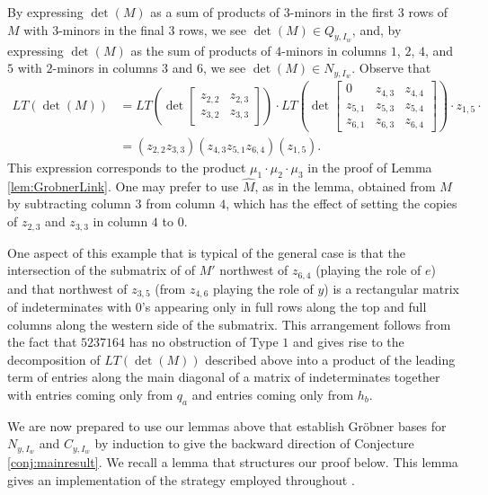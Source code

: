 \begin{example}
 By expressing $\det(M)$ as a sum of products of $3$-minors in the first $3$ rows of $M$ with $3$-minors in the final $3$ rows, we see $\det(M) \in Q_{y,I_w}$, and, by expressing $\det(M)$ as the sum of products of $4$-minors in columns $1$, $2$, $4$, and $5$ with $2$-minors in columns $3$ and $6$, we see $\det(M) \in N_{y,I_w}$.  Observe that \begin{align*}
 LT(\det(M)) &=  LT\left(\det \begin{bmatrix} z_{2,2} & z_{2,3} \\ z_{3,2} & z_{3,3} \end{bmatrix} \right) \cdot LT\left(\det  \begin{bmatrix} 0 & z_{4,3} & z_{4,4} \\ z_{5,1} & z_{5,3} & z_{5,4} \\ z_{6,1} & z_{6,3} & z_{6,4} \end{bmatrix}\right) \cdot z_{1,5} \cdot\\
 &= (z_{2,2}z_{3,3})(z_{4,3}z_{5,1}z_{6,4})(z_{1,5}).
 \end{align*}
 This expression corresponds to the product $\mu_1 \cdot \mu_2 \cdot \mu_3$ in the proof of Lemma \ref{lem:GrobnerLink}.  One may prefer to use $\widehat{M}$, as in the lemma, obtained from $M$ by subtracting column $3$ from column $4$, which has the effect of setting the copies of $z_{2,3}$ and $z_{3,3}$ in column $4$ to $0$.  
 
One aspect of this example that is typical of the general case is that the intersection of the submatrix of of $M'$ northwest of $z_{6,4}$ (playing the role of $e$) and that northwest of $z_{3,5}$ (from $z_{4,6}$ playing the role of $y$) is a rectangular matrix of indeterminates with $0$'s appearing only in full rows along the top and full columns along the western side of the submatrix.  This arrangement follows from the fact that $5237164$ has no obstruction of Type $1$ and gives rise to the decomposition of $LT(\det(M))$ described above into a product of the leading term of entries along the main diagonal of a matrix of indeterminates together with entries coming only from $q_a$ and entries coming only from $h_b$.
\end{example}

We are now prepared to use our lemmas above that establish Gr\"obner bases for $N_{y,I_w}$ and $C_{y,I_w}$ by induction to give the backward direction of Conjecture \ref{conj:mainresult}.  We recall a lemma that structures our proof below.  This lemma gives an implementation of the strategy employed throughout \cite{GMN13}.  

